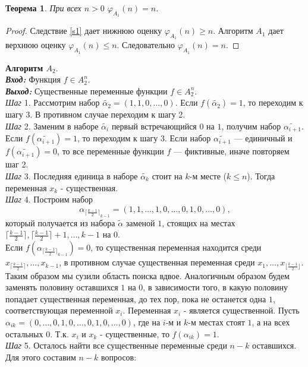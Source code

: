 \documentclass[oneside, final, 14pt]{extreport}
\newtheorem{thm}{Теорема}
\begin{document}
	\begin{thm} 
		При всех $n>0$  $\varphi_{A_1}(n) = n$.
	\end{thm}
	\begin{proof}
		Следствие \ref{s1} дает нижнюю оценку $\varphi_{A_1}(n) \geq n$. Алгоритм $A_1$ дает верхнюю оценку $\varphi_{A_1}(n) \leq n$. Следовательно 
		$\varphi_{A_1}(n) = n$.
	\end{proof}

	\noindent\textbf{Алгоритм $A_2$}. \\
	\emph{\textbf{Вход:}} Функция $f \in A_2^n$.\\
	\emph{\textbf{Выход:}} Существенные переменные функции $f \in A_2^n$.\\
	\emph{Шаг} 1. Рассмотрим набор $\tilde{\alpha_2} = (1, 1, 0, \ldots, 0)$. Если $f(\tilde{\alpha_2}) = 1$, то переходим к шагу 3. 
	В противном	случае переходим к шагу 2.\\
	\emph{Шаг} 2. Заменим в  наборе $\tilde{\alpha_i}$ первый встречающийся $0$ на  $1$, получим набор $\tilde{\alpha_{i+1}}$.
	Если $f(\tilde{\alpha_{i+1}}) = 1$, то переходим к шагу 3. Если набор
	 $\tilde{\alpha_{i+1}}$ --- единичный и $f(\tilde{\alpha_{i+1}}) = 0$, то все переменные функции $f$ --- фиктивные, иначе повторяем шаг 2.\\
	\emph{Шаг} 3. Последняя единица в наборе $\tilde{\alpha_k}$ стоит на $k$-м месте ($k \leq n$). Тогда переменная  $x_k$ - существенная.\\
	\emph{Шаг} 4. Построим набор 
	$${\alpha_{\lceil \frac{k-1}{2}\rceil_{k-1}}} = (1, 1, \ldots, 1, 0, \ldots, 0, 1, 0, \ldots, 0),$$
	 который получается из набора $\tilde{\alpha}$ заменой $1$, стоящих на местах $\lceil \frac{k-1}{2} \rceil, \lceil \frac{k-1}{2} \rceil + 1, \ldots, k-1$ на $0$. \\
	 Если $f({\alpha_{\lceil\frac{k-1}{2}\rceil_{k-1}}}) = 0$, то существенная переменная находится среди $x_{\lceil\frac{k-1}{2}\rceil}, \ldots, x_{k-1}$, в противном
	 случае существенная переменная среди $x_1, \ldots, x_{\lfloor \frac{k-1}{2} \rfloor}$. Таким образом мы сузили область поиска вдвое. 
	 Аналогичным образом 
	 будем заменять половину оставшихся $1$ на $0$, в зависимости  того, в какую половину попадает существенная переменная, до тех пор, пока не останется 
	 одна $1$, соответствующая переменной $x_i$. 
	 Переменная $x_i$ - является существенной. Пусть $\alpha_{ik} = (0, \ldots,0, 1, 0, \ldots, 0, 1, 0, \ldots, 0)$, где на $i$-м и  $k$-м местах стоят $1$, а на всех 
	 остальных $0$. Т.к. $x_i$ и $x_k$ - существенные, то  $f(\alpha_{ik}) = 1$. \\
	 \emph{Шаг} 5. Осталось найти все существенные переменные среди $n-k$ оставшихся. Для этого составим $n-k$ вопросов: 
	 
\end{document}
